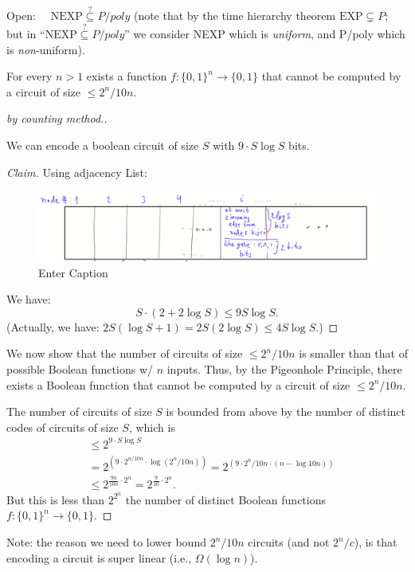 Open: $\quad \mathrm{NEXP}\stackrel{?}{\subseteq}P/poly$ (note that by the time hierarchy theorem $\mathrm{EXP}\subsetneq P$; but in ``$\mathrm{NEXP}\stackrel{?}{\subseteq}P/poly$'' we consider NEXP which is \emph{uniform}, and P/poly which is \textit{non}-uniform).


\begin{theorem}
    For every $n>1$ exists a function $f:\{0,1\}^n \rightarrow\{0,1\}$ that cannot be computed by a circuit of size  $\le 2^n / 10 n$.
\end{theorem}

\begin{proof}[by counting method.]
\mbox{}\\

\begin{claim}
We can encode a boolean circuit of size $S$ with $9\cdot S \log S$ bits.
\end{claim}

\begin{proof}[Claim]
Using adjacency List:
\begin{figure}[H]
    \centering
    \includegraphics[width=1.1\linewidth]{images/shannon_table.png}
    \caption{Enter Caption}
    \label{fig:enter-label}
\end{figure}




We have:
$$
S \cdot(2+2 \log S) \leq 9 S \log S
.$$
(Actually, we have: 
$ 2S(\log S+1) = 2S(2 \log S) \leq 4 S \log S.
$)
\end{proof}

We now show that the number of circuits of size $\leq 2^n / 10 n$ is smaller than that of possible Boolean functions w/ $n$ inputs.
Thus, by the Pigeonhole Principle, there exists a Boolean function that cannot be computed by a circuit of size $\leq 2^n / 10 n$.

The number of circuits of size $S$ is bounded from above by the number of distinct codes of circuits of size $S$, which is
$$
\begin{aligned}
& \leq 2^{9 \cdot S \log S} \\
& =2^{\left(9 \cdot 2^{n / 10 n} \cdot \log \left(2^n / 10 n\right)\right)}=2^{\left(9 \cdot 2^n / 10 n \cdot(n-\log 10 n)\right)} \\
& \leq 2^{\frac{9 n}{10 n} \cdot 2^n}=2^{\frac{9}{10} \cdot 2^n} . 
\end{aligned}
$$
But this is 
less than $2^{2^n}$ the number of distinct Boolean functions $f:\{0,1\}^n\to\{0,1\}$. 
\end{proof}




Note: the reason we need to lower bound $2^n/10n$ circuits (and not $2^n/c$), is that encoding a circuit is super linear (i.e., $\Omega (\log n)$).



